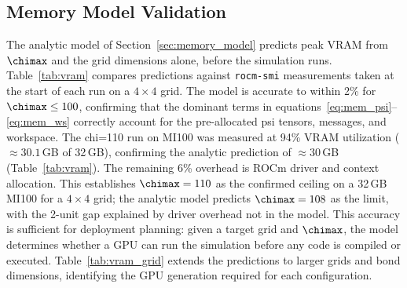 \FloatBarrier
\subsection{Memory Model Validation}
\label{sec:memory_validation}

The analytic model of Section~\ref{sec:memory_model} predicts peak VRAM from
$\chimax$ and the grid dimensions alone, before the simulation runs.
Table~\ref{tab:vram} compares predictions against \texttt{rocm-smi} measurements
taken at the start of each run on a $4\times4$ grid.
The model is accurate to within 2\% for $\chimax \leq 100$, confirming that
the dominant terms in equations~\eqref{eq:mem_psi}--\eqref{eq:mem_ws} correctly
account for the pre-allocated psi tensors, messages, and workspace.
The chi=110 run on MI100 was measured at 94\% VRAM utilization
($\approx 30.1$\,GB of 32\,GB), confirming the analytic prediction
of $\approx 30$\,GB (Table~\ref{tab:vram}).
The remaining 6\% overhead is ROCm driver and context allocation.
This establishes $\chimax = 110$ as the confirmed ceiling on a 32\,GB MI100
for a $4\times4$ grid; the analytic model predicts $\chimax = 108$ as the
limit, with the 2-unit gap explained by driver overhead not in the model.
This accuracy is sufficient for deployment planning: given a target grid and
$\chimax$, the model determines whether a GPU can run the simulation before any
code is compiled or executed.
Table~\ref{tab:vram_grid} extends the predictions to larger grids and bond
dimensions, identifying the GPU generation required for each configuration.

